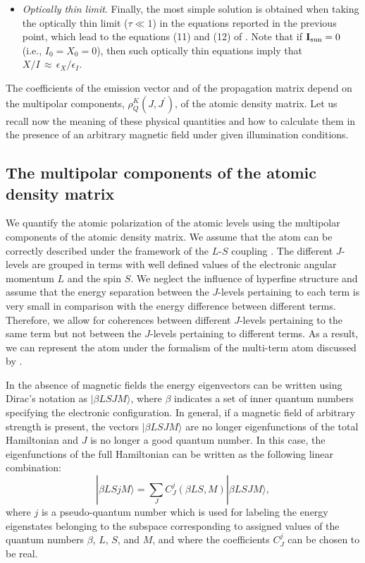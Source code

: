 \documentclass[12pt]{article}
\begin{document}
\begin{itemize}
\item {\em Optically thin limit}. Finally, the most simple solution 
is obtained when taking the optically thin limit ($\tau{\ll}1$) in the equations reported in the previous point, which lead to the equations (11) and (12) of \cite{trujillo_asensio07}. Note that if $\mathbf{I}_{\rm sun}=0$ (i.e., $I_0=X_0=0$), then such optically thin equations imply that ${X/I}\,{\approx}\,{\epsilon_X}/{\epsilon_I}$. 

\end{itemize}

The coefficients of the emission vector and of the propagation matrix
depend on the multipolar components, $\rho^K_Q(J,J^{'})$, of the atomic density
matrix. Let us recall now the meaning of these physical quantities and how to
calculate them in the presence of an arbitrary magnetic field under given
illumination conditions.  

\subsection{The multipolar components of the atomic density matrix}

We quantify the atomic polarization of the atomic levels using the multipolar components 
of the atomic density matrix. We assume that the atom can be correctly described under 
the framework of the $L$-$S$ coupling \citep[e.g.,][]{condon_shortley35}. The  
different $J$-levels are grouped in terms with well defined values of the
electronic angular momentum $L$ and the spin $S$. We neglect the influence of
hyperfine structure and assume that the energy
separation between the $J$-levels pertaining to 
each term is very small in comparison with the energy difference between
different terms. Therefore, we allow for coherences between
different 
$J$-levels pertaining to the same term but not between the $J$-levels
pertaining to 
different terms. As a result, we can represent the atom under the 
formalism of the multi-term atom discussed by \cite{landi_landolfi04}.

In the absence of magnetic fields the energy eigenvectors can be written using
Dirac's notation as $|\beta L S J M\rangle$, where
$\beta$ indicates a set of inner quantum numbers specifying the electronic
configuration. In general, if a magnetic field of 
arbitrary strength is present, the vectors $|\beta L S J M\rangle$ are no longer
eigenfunctions of the total Hamiltonian and $J$ is no longer a good quantum
number. In this
case, the eigenfunctions of the full Hamiltonian can be written as the following
linear combination:
\begin{equation}
\label{eq:eigenfunctions_total_hamiltonian}
|\beta L S j M\rangle = \sum_J C_J^j(\beta L S, M) |\beta L S J M\rangle,
\end{equation}
where $j$ is a pseudo-quantum number which is used for labeling the energy
eigenstates belonging to the subspace corresponding to assigned values of the
quantum numbers $\beta$, $L$, $S$, and $M$, and where the coefficients $C_J^j$
can be chosen to be real. 
\end{document}
